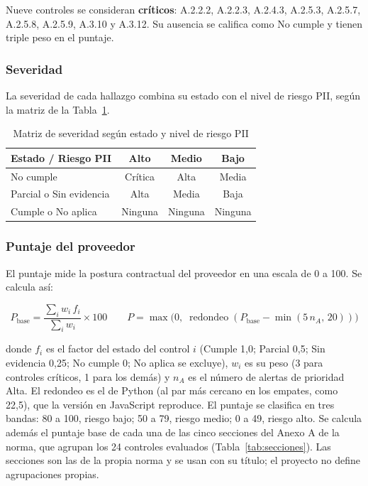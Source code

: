 \documentclass[12pt,letterpaper]{article}
\begin{document}
Nueve controles se consideran \textbf{críticos}: A.2.2.2, A.2.2.3, A.2.4.3, A.2.5.3, A.2.5.7, A.2.5.8, A.2.5.9, A.3.10 y A.3.12. Su ausencia se califica como No cumple y tienen triple peso en el puntaje.

\subsubsection{Severidad}

La severidad de cada hallazgo combina su estado con el nivel de riesgo PII, según la matriz de la Tabla~\ref{tab:severidad}.

\begin{table}[H]
\centering
\small
\caption{Matriz de severidad según estado y nivel de riesgo PII}
\label{tab:severidad}
\begin{tabular}{@{}l c c c@{}}
\toprule
\textbf{Estado / Riesgo PII} & \textbf{Alto} & \textbf{Medio} & \textbf{Bajo} \\
\midrule
No cumple & Crítica & Alta & Media \\
Parcial o Sin evidencia & Alta & Media & Baja \\
Cumple o No aplica & Ninguna & Ninguna & Ninguna \\
\bottomrule
\end{tabular}
\end{table}

\subsubsection{Puntaje del proveedor}

El puntaje mide la postura contractual del proveedor en una escala de 0 a 100. Se calcula así:

\begin{equation}
P_{\text{base}} = \frac{\sum_{i} w_i \, f_i}{\sum_{i} w_i} \times 100
\qquad
P = \max\bigl(0,\; \operatorname{redondeo}(P_{\text{base}} - \min(5\,n_A,\, 20))\bigr)
\end{equation}

\noindent donde $f_i$ es el factor del estado del control $i$ (Cumple 1,0; Parcial 0,5; Sin evidencia 0,25; No cumple 0; No aplica se excluye), $w_i$ es su peso (3 para controles críticos, 1 para los demás) y $n_A$ es el número de alertas de prioridad Alta. El redondeo es el de Python (al par más cercano en los empates, como 22,5), que la versión en JavaScript reproduce. El puntaje se clasifica en tres bandas: 80 a 100, riesgo bajo; 50 a 79, riesgo medio; 0 a 49, riesgo alto. Se calcula además el puntaje base de cada una de las cinco secciones del Anexo A de la norma, que agrupan los 24 controles evaluados (Tabla~\ref{tab:secciones}). Las secciones son las de la propia norma y se usan con su título; el proyecto no define agrupaciones propias.
\end{document}

